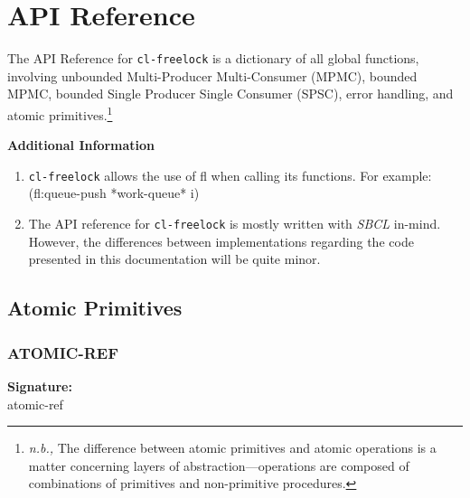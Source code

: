 \documentclass[12pt, letterpaper]{article}
\DeclareRobustCommand{\code}[1]{%
	\begingroup
	\setlength{\fboxsep}{2pt}%
	\colorbox{gray!15}{\ttfamily\small #1}%
	\endgroup
}
\newcommand{\multicomment}[1]{}
\newcommand{\customitem}[2]{%
	\noindent\textbf{#1}\\[0.5ex]%
	#2\vspace{1ex}%
}
\begin{document}
	\section{API Reference}
	The API Reference for \texttt{cl-freelock} is a dictionary of all global functions, involving unbounded Multi-Producer Multi-Consumer (MPMC), bounded MPMC, bounded Single Producer Single Consumer (SPSC), error handling, and atomic primitives.\footnote{\textit{n.b.,} The difference between atomic primitives and atomic operations is a matter concerning layers of abstraction---operations are composed of combinations of primitives and non-primitive procedures.}
	
	\textbf{Additional Information}
	
	\begin{enumerate}
		\item \texttt{cl-freelock} allows the use of \code{fl} when calling its functions.
		\subitem  For example: \code{(fl:queue-push *work-queue* i)}
		\item The API reference for \texttt{cl-freelock} is mostly written with \textit{SBCL} in-mind. However, the differences between implementations regarding the code presented in this documentation will be quite minor.
	\end{enumerate}
	\multicomment{According to ai: "This is the most important reason. When lwarp sees a description environment, it translates it directly into an HTML Definition List (<dl>, <dt>, <dd>). This is semantically perfect for the web. It means your API reference will automatically look great on mobile phones, and screen readers will perfectly understand the structure. (If you used Option 2 or 3, lwarp would generate an HTML <table>, which is terrible for mobile viewing)."
	I will need to investigate the HTML to confirm this is true, but for now it seems to make sense, so it wont hurt to atleast try. Additionally, it would stop the need for manual spacing with \\ and \vspace. I already import the enumitem package, so I might aswell extend its use.
	Update: This method DID NOT work, as lwarp can't handle enumitem's \item in certain contexts. Thus, we will just use standard latex instead.}
	
	\subsection{Atomic Primitives}
	\subsubsection{ATOMIC-REF}
	\customitem{Signature:}{\code{atomic-ref}}
	
\end{document}
